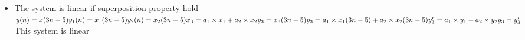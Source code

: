 \documentclass[10pt,a4paper, margin=1in]{article}
\begin{document}
\begin{enumerate}
\begin{enumerate}
\begin{itemize}
  	 $y(t) = h(x(3t - 5))\\
  	 x(t)= h^{-1}(y((t+5)/3))$\\
  	 The system is invertible.
  	   	 \item The system is linear if superposition property hold\\
  	 $y(n)=x(3n-5)\\
  	 y_1(n)=x_1(3n-5)\\
  	 y_2(n)=x_2(3n-5)\\
  	 x_3=a_1 \times x_1 + a_2 \times x_2 \\
  	 y_3=x_3(3n-5)\\
  	 y_3=a_1\times x_1(3n-5)+a_2 \times x_2(3n-5)\\
  	 y_3' = a_1 \times y_1+a_2 \times y_2\\
  	 y_3=y_3' $
  	 This system is linear
  	 \end{itemize}


\end{enumerate}
\end{enumerate}
\end{document}
